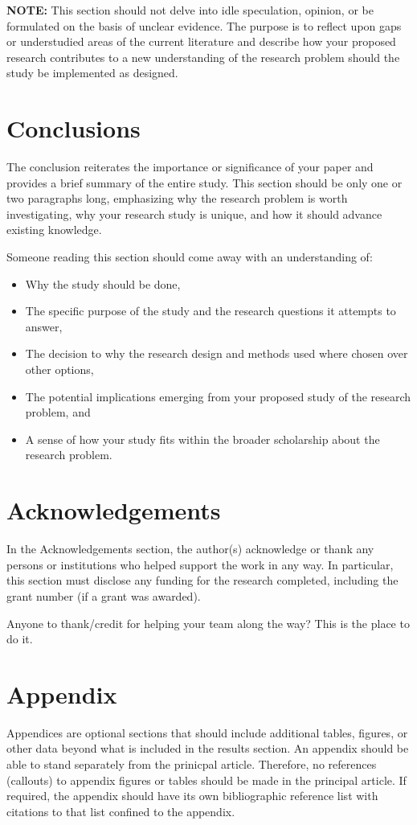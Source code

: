 \documentclass[10pt,twocolumn,letterpaper]{article}
\begin{document}
\textbf{NOTE:} This section should not delve into idle speculation, opinion, or be formulated on the basis of unclear evidence. The purpose is to reflect upon gaps or understudied areas of the current literature and describe how your proposed research contributes to a new understanding of the research problem should the study be implemented as designed.

\section{Conclusions}
The conclusion reiterates the importance or significance of your paper and provides a brief summary of the entire study. This section should be only one or two paragraphs long, emphasizing why the research problem is worth investigating, why your research study is unique, and how it should advance existing knowledge.

Someone reading this section should come away with an understanding of:
\begin{itemize}
    \item Why the study should be done,
    \item The specific purpose of the study and the research questions it attempts to answer,
    \item The decision to why the research design and methods used where chosen over other options,
    \item The potential implications emerging from your proposed study of the research problem, and
    \item A sense of how your study fits within the broader scholarship about the research problem.
\end{itemize}

\section{Acknowledgements}
In the Acknowledgements section, the author(s) acknowledge or thank any persons or institutions who helped support the work in any way. In particular, this section must disclose any funding for the research completed, including the grant number (if a grant was awarded).

Anyone to thank/credit for helping your team along the way? This is the place to do it.

\section{Appendix}
Appendices are optional sections that should include additional tables, figures, or other data beyond what is included in the results section. An appendix should be able to stand separately from the prinicpal article. Therefore, no references (callouts) to appendix figures or tables should be made in the principal article. If required, the appendix should have its own bibliographic reference list with citations to that list confined to the appendix. \cite{latexcompanion}




\end{document}
